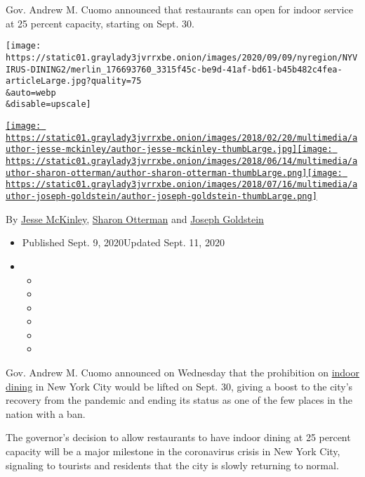 Gov. Andrew M. Cuomo announced that restaurants can open for indoor
service at 25 percent capacity, starting on Sept. 30.

\texttt{[image: https://static01.graylady3jvrrxbe.onion/images/2020/09/09/nyregion/NYVIRUS-DINING2/merlin\_176693760\_3315f45c-be9d-41af-bd61-b45b482c4fea-articleLarge.jpg?quality=75\\\&auto=webp\\\&disable=upscale]}

\href{https://www.nytimes3xbfgragh.onion/by/jesse-mckinley}{\texttt{[image: https://static01.graylady3jvrrxbe.onion/images/2018/02/20/multimedia/author-jesse-mckinley/author-jesse-mckinley-thumbLarge.jpg]}}\href{https://www.nytimes3xbfgragh.onion/by/sharon-otterman}{\texttt{[image: https://static01.graylady3jvrrxbe.onion/images/2018/06/14/multimedia/author-sharon-otterman/author-sharon-otterman-thumbLarge.png]}}\href{https://www.nytimes3xbfgragh.onion/by/joseph-goldstein}{\texttt{[image: https://static01.graylady3jvrrxbe.onion/images/2018/07/16/multimedia/author-joseph-goldstein/author-joseph-goldstein-thumbLarge.png]}}

By \href{https://www.nytimes3xbfgragh.onion/by/jesse-mckinley}{Jesse
McKinley},
\href{https://www.nytimes3xbfgragh.onion/by/sharon-otterman}{Sharon
Otterman} and
\href{https://www.nytimes3xbfgragh.onion/by/joseph-goldstein}{Joseph
Goldstein}

\begin{itemize}
\item
  Published Sept. 9, 2020Updated Sept. 11, 2020
\item
  \begin{itemize}
  \item
  \item
  \item
  \item
  \item
  \item
  \end{itemize}
\end{itemize}

Gov. Andrew M. Cuomo announced on Wednesday that the prohibition on
\href{https://www.nytimes3xbfgragh.onion/2020/09/10/nyregion/nyc-outdoor-dining-homeless.html}{indoor
dining} in New York City would be lifted on Sept. 30, giving a boost to
the city's recovery from the pandemic and ending its status as one of
the few places in the nation with a ban.

The governor's decision to allow restaurants to have indoor dining at 25
percent capacity will be a major milestone in the coronavirus crisis in
New York City, signaling to tourists and residents that the city is
slowly returning to normal.

